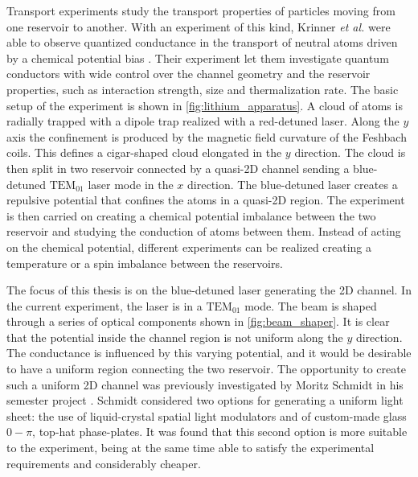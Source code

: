 Transport experiments study the transport properties of particles moving from one reservoir to another. With an experiment of this kind, Krinner \emph{et al.} were able to observe  quantized conductance in the transport of neutral atoms driven by a chemical potential bias \cite{krinner2015}. Their experiment let them investigate
quantum conductors with wide control over the channel
geometry and the reservoir properties, such as interaction strength, size and thermalization rate. The basic setup of the experiment is shown in \cref{fig:lithium_apparatus}. A cloud of atoms is radially trapped with a dipole trap realized with a red-detuned laser. Along the $y$ axis the confinement is produced by the magnetic field curvature of the Feshbach coils. This defines a cigar-shaped cloud elongated in the $y$ direction. The cloud is then split in two reservoir connected by a quasi-2D channel sending a blue-detuned $\text{TEM}_{01}$ laser mode in the $x$ direction. The blue-detuned laser creates a repulsive potential that confines the atoms in a quasi-2D region. The experiment is then carried on creating a chemical potential imbalance between the two reservoir and studying the conduction of atoms between them. Instead of acting on the chemical potential, different experiments can be realized creating a temperature or a spin imbalance between the reservoirs.

The focus of this thesis is on the blue-detuned laser generating the 2D channel. In the current experiment, the laser is in a $\text{TEM}_{01}$ mode. The beam is shaped through a series of optical components shown in \cref{fig:beam_shaper}. It is clear that the potential inside the channel region is not uniform along the $y$ direction. The conductance is influenced by this varying potential, and it would be desirable to have a uniform region connecting the two reservoir. The opportunity to create such a uniform 2D channel was previously investigated by Moritz Schmidt in his semester project \cite{schmidt2021}. Schmidt considered two options for generating a uniform light sheet: the use of liquid-crystal spatial light modulators and of custom-made glass $0-\pi$, top-hat phase-plates. It was found that this second option is more suitable to the experiment, being at the same time  able to satisfy the experimental requirements and considerably cheaper.


